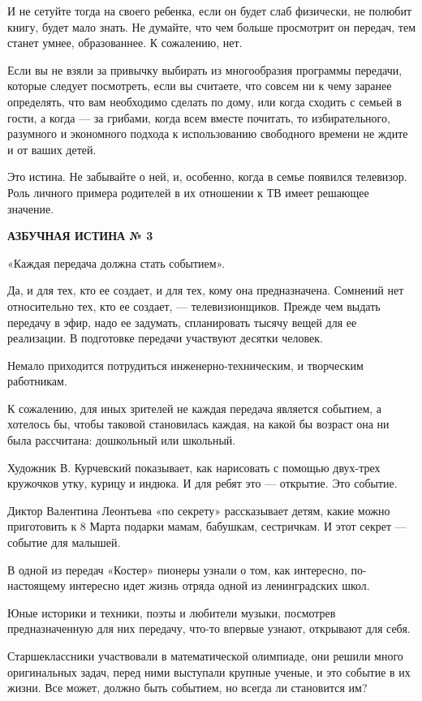 \documentclass[12pt, a4paper, openany]{book}
\begin{document}
И не сетуйте тогда на своего ребенка, если он будет слаб физически, не полюбит книгу, будет мало знать. Не думайте, что чем больше просмотрит он передач, тем станет умнее, образованнее. К сожалению, нет. 

Если вы не взяли за привычку выбирать из многообразия программы передачи, которые следует посмотреть, если вы считаете, что совсем ни к чему заранее определять, что вам необходимо сделать по дому, или когда сходить с семьей в гости, а когда — за грибами, когда всем вместе почитать, то избирательного, разумного и экономного подхода к использованию свободного времени не ждите и от ваших детей. 

Это истина. Не забывайте о ней, и, особенно, когда в семье появился телевизор. Роль личного примера родителей в их отношении к ТВ имеет решающее значение. 

\begin{center}
	\textbf{АЗБУЧНАЯ ИСТИНА № 3 }

«Каждая передача должна стать событием». 
\end{center}

Да, и для тех, кто ее создает, и для тех, кому она предназначена. Сомнений нет относительно тех, кто ее создает, — телевизионщиков. Прежде чем выдать передачу в эфир, надо ее задумать, спланировать тысячу вещей для ее реализации. В подготовке передачи участвуют десятки человек.

Немало приходится потрудиться инженерно-техническим, и творческим работникам. 

К сожалению, для иных зрителей не каждая передача является событием, а хотелось бы, чтобы таковой становилась каждая, на какой бы возраст она ни была рассчитана: дошкольный или школьный. 

Художник В. Курчевский показывает, как нарисовать с помощью двух-трех кружочков утку, курицу и индюка. И для ребят это — открытие. Это событие. 

Диктор Валентина Леонтьева «по секрету» рассказывает детям, какие можно приготовить к 8 Марта подарки мамам, бабушкам, сестричкам. И этот секрет — событие для малышей. 

В одной из передач «Костер» пионеры узнали о том, как интересно, по-настоящему интересно идет жизнь отряда одной из ленинградских школ. 

Юные историки и техники, поэты и любители музыки, посмотрев предназначенную для них передачу, что-то впервые узнают, открывают для себя. 

Старшеклассники участвовали в математической олимпиаде, они решили много оригинальных задач, перед ними выступали крупные ученые, и это событие в их жизни. Все может, должно быть событием, но всегда ли становится им? 
\end{document}
